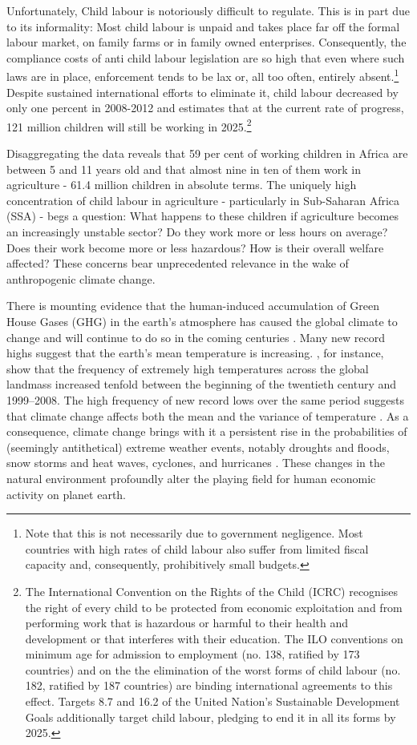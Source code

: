 \documentclass[a4paper,12pt]{article}
\theoremstyle{plain}
\theoremstyle{definition}
\theoremstyle{definition}
\theoremstyle{definition}
\theoremstyle{definition}
\begin{document}
Unfortunately, Child labour is notoriously difficult to regulate. This is in part due to its informality: Most child labour is unpaid and takes place far off the formal labour market, on family farms or in family owned enterprises. Consequently, the compliance costs of anti child labour legislation are so high that even where such laws are in place, enforcement tends to be lax or, all too often, entirely absent.\footnote{Note that this is not necessarily due to government negligence. Most countries with high rates of child labour also suffer from limited fiscal capacity and, consequently, prohibitively small budgets.} Despite sustained international efforts to eliminate it, child labour decreased by only one percent in 2008-2012 and \citet{ILO2017} estimates that at the current rate of progress, 121 million children will still be working in 2025.\footnote{The International Convention on the Rights of the Child (ICRC) recognises the right of every child to be protected from economic exploitation and from performing work that is hazardous or harmful to their health and development or that interferes with their education. The ILO conventions on minimum age for admission to employment (no. 138, ratified by 173 countries) and on the the elimination of the worst forms of child labour (no. 182, ratified by 187 countries) are binding international agreements to this effect. Targets 8.7 and 16.2 of the United Nation's Sustainable Development Goals additionally target child labour, pledging to end it in all its forms by 2025.}

Disaggregating the data reveals that 59 per cent of working children in Africa are between 5 and 11 years old and that almost nine in ten of them work in agriculture - 61.4 million children in absolute terms. The uniquely high concentration of child labour in agriculture - particularly in Sub-Saharan Africa (SSA) - begs a question: What happens to these children if agriculture becomes an increasingly unstable sector? Do they work more or less hours on average? Does their work become more or less hazardous? How is their overall welfare affected? These concerns bear unprecedented relevance in the wake of anthropogenic climate change.

There is mounting evidence that the human-induced accumulation of Green House Gases (GHG) in the earth's atmosphere has caused the global climate to change and will continue to do so in the coming centuries \citep{Pachauri2014}. Many new record highs suggest that the earth's mean temperature is increasing. \citet{Munasinghe2012}, for instance, show that the frequency of extremely high temperatures across the global landmass increased tenfold between the beginning of the twentieth century and 1999–2008. The high frequency of new record lows over the same period suggests that climate change affects both the mean and the variance of temperature \citep{Auffhammer2014a}. As a consequence, climate change brings with it a persistent rise in the probabilities of (seemingly antithetical) extreme weather events, notably droughts and floods, snow storms and heat waves, cyclones, and hurricanes \citep{Pachauri2014}. These changes in the natural environment profoundly alter the playing field for human economic activity on planet earth.
\end{document}

